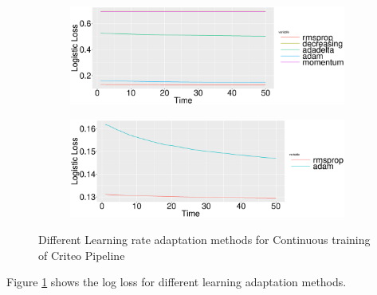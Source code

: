 \documentclass[10pt,conference,letterpaper]{IEEEtran}
\begin{document}
\begin{figure}[H]
\begin{subfigure}{0.5\columnwidth}
\includegraphics[width=\columnwidth]{../images/experiment-results/criteo-learning-rate-comparison-1.eps}
\caption{}
\label{fig:criteo-learning-rate-1}
\end{subfigure}%
\begin{subfigure}{0.5\columnwidth}
\includegraphics[width=\columnwidth]{../images/experiment-results/criteo-learning-rate-comparison.eps}
\caption{}
\label{fig:criteo-learning-rate}
\end{subfigure}
\vspace{2mm}
\caption{Different Learning rate adaptation methods for Continuous training of Criteo Pipeline}
\end{figure}

Figure \ref{fig:criteo-learning-rate-1} shows the log loss for different learning adaptation methods. 
\end{document}
